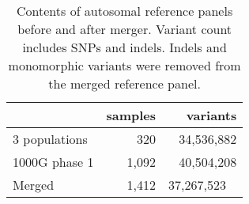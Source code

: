 \begin{table}[htbp]
\centering
\begin{tabular}{l|r|r}
 & samples & variants \\ \hline
 3 populations & 320 & 34,536,882 \\
 1000G phase 1 & 1,092 & 40,504,208 \\
 Merged & 1,412 & 37,267,523 \ %
\end{tabular}
\caption[Sample and SNP count of reference panels before and after merger.]{Contents of autosomal reference panels before and after merger. Variant count includes SNPs and indels. Indels and monomorphic variants were removed from the merged reference panel.}
\label{tab:SNP_count_merger}
\end{table}